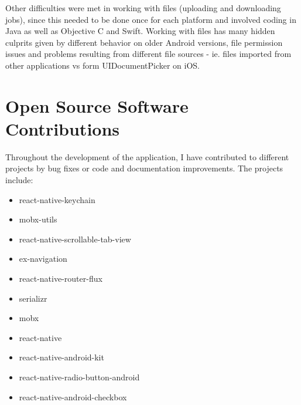 Other difficulties were met in working with files (uploading and downloading jobs), since this needed to be done once for each platform and involved coding in Java as well as Objective C and Swift. Working with files has many hidden culprits given by different behavior on older Android versions, file permission issues and problems resulting from different file sources - ie. files imported from other applications vs form UIDocumentPicker on iOS.


\section{Open Source Software Contributions}

Throughout the development of the application, I have contributed to different projects by bug fixes or code and documentation improvements. The projects include: 


\begin{itemize}
\item react-native-keychain
\item mobx-utils
\item react-native-scrollable-tab-view
\item ex-navigation
\item react-native-router-flux
\item serializr
\item mobx
\item react-native
\item react-native-android-kit
\item react-native-radio-button-android
\item react-native-android-checkbox
\end{itemize}
